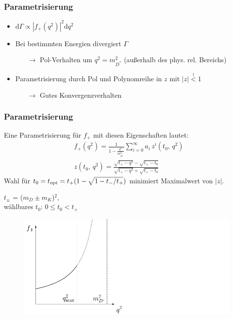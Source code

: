 \documentclass[hyperref={pdfpagelabels=false}]{beamer}
\begin{document}
\begin{frame}
\frametitle{Parametrisierung}
\begin{itemize}
 \item $\mathrm{d}\Gamma \propto |f_+(q^2)|^2\mathrm{d}q^2$
 \item Bei bestimmten Energien divergiert $\Gamma$
 \begin{itemize}
  \item [$\rightarrow$] Pol-Verhalten um $q^2 = m_{D^*}^2$ (außerhalb des phys. rel. Bereichs)
 \end{itemize}
 \item Parametrisierung durch Pol und Polynomreihe in $z$ mit $|z|\stackrel{!}{<}1$
 \begin{itemize}
  \item [$\rightarrow$] Gutes Konvergenzverhalten
 \end{itemize}
\end{itemize}
\end{frame}

\begin{frame}
 \frametitle{Parametrisierung}

 \begin{minipage}[h]{0.48\textwidth}
 Eine Parametrisierung für $f_+$ mit diesen Eigenschaften lautet:
\begin{align*}
 &f_+(q^2) = \frac{1}{1-\frac{q^2}{m_{D^*}^2}} \sum\limits_{i=0}^\infty a_i\,z^i(t_0,\, q^2)\\
 &z(t_0,\, q^2)= \frac{\sqrt{t_+-q^2}-\sqrt{t_+-t_0}}{\sqrt{t_+-q^2}+\sqrt{t_+-t_0}}
\end{align*}
Wahl für $t_0 = \\t_\text{opt} = t_+(1-\sqrt{1-t_-/t_+})$ minimiert Maximalwert von $|z|$.

\vspace{0.5cm}
\small{$t_\pm$ = ($m_D \pm m_K$)$^2$,\\wählbares $t_0$: $0\leq t_0 < t_+$}
 \end{minipage}
 \begin{minipage}[h]{0.40\textwidth}
 \begin{figure}
  \includegraphics[width=2.7\textwidth]{../Abbildungen/formMuster.png}
 \end{figure}
 \end{minipage}
\end{frame}
\end{document}
